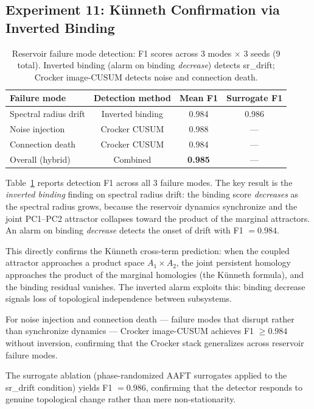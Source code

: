\documentclass[11pt,a4paper]{article}
\begin{document}
\subsection{Experiment 11: K\"unneth Confirmation via Inverted Binding}\label{sec:res-kunneth}

\begin{table}[t]
\centering
\caption{Reservoir failure mode detection: F1 scores across 3 modes $\times$ 3 seeds (9 total). Inverted binding (alarm on binding \emph{decrease}) detects sr\_drift; Crocker image-CUSUM detects noise and connection death.}
\label{tab:kunneth}
\begin{tabular}{lccc}
\toprule
Failure mode & Detection method & Mean F1 & Surrogate F1 \\
\midrule
Spectral radius drift & Inverted binding & 0.984 & 0.986 \\
Noise injection & Crocker CUSUM & 0.988 & --- \\
Connection death & Crocker CUSUM & 0.984 & --- \\
\midrule
Overall (hybrid) & Combined & \textbf{0.985} & --- \\
\bottomrule
\end{tabular}
\end{table}

Table~\ref{tab:kunneth} reports detection F1 across all 3 failure modes.
The key result is the \emph{inverted binding} finding on spectral radius drift: the binding score \emph{decreases} as the spectral radius grows, because the reservoir dynamics synchronize and the joint PC1--PC2 attractor collapses toward the product of the marginal attractors.
An alarm on binding \emph{decrease} detects the onset of drift with F1 $= 0.984$.

This directly confirms the K\"unneth cross-term prediction: when the coupled attractor approaches a product space $A_1 \times A_2$, the joint persistent homology approaches the product of the marginal homologies (the K\"unneth formula), and the binding residual vanishes.
The inverted alarm exploits this: binding decrease signals loss of topological independence between subsystems.

For noise injection and connection death --- failure modes that disrupt rather than synchronize dynamics --- Crocker image-CUSUM achieves F1 $\geq 0.984$ without inversion, confirming that the Crocker stack generalizes across reservoir failure modes.

The surrogate ablation (phase-randomized AAFT surrogates applied to the sr\_drift condition) yields F1 $= 0.986$, confirming that the detector responds to genuine topological change rather than mere non-stationarity.
\end{document}
